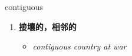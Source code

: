 
\begin{frame}
{\huge contiguous}
\begin{center}
\begin{enumerate}\Large
  \item \textbf{接壤的，相邻的}
  \begin{itemize}
    \item \em{\Large{contiguous country at war}}
  \end{itemize}
\end{enumerate}
\end{center}
\end{frame}
